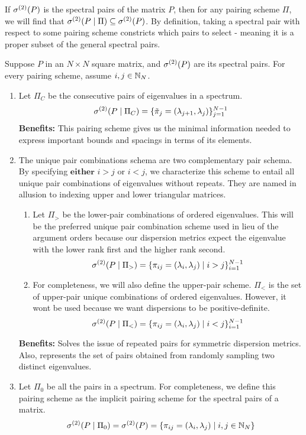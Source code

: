 \begin{remark} If ${\sigma^{(2)}}(P)$ is the spectral pairs of the matrix $P$, then for any pairing scheme $\Pi$, we will find that ${\sigma^{(2)}}(P \mid \Pi) \subseteq {\sigma^{(2)}}(P)$.
By definition, taking a spectral pair with respect to some pairing scheme constricts which pairs to select - meaning it is a proper subset of the general spectral pairs.
\end{remark}

{}

\noindent Suppose $P$ in an $N \times N$ square matrix, and ${\sigma^{(2)}}(P)$ are its spectral pairs. For every pairing scheme, assume $i,j \in \mathbb{N}_N$.

\begin{enumerate}
  \item Let $\Pi_C$ be the consecutive pairs of eigenvalues in a spectrum.
    $${\sigma^{(2)}}(P \mid \Pi_C) = \{{\tilde{\pi}}_{j} = (\lambda_{j + 1},\lambda_j)\}_{j = 1}^{N-1}$$
    \textbf{Benefits:} This pairing scheme gives us the minimal information needed to express important bounds and spacings in terms of its elements.
  \item The unique pair combinations schema are two complementary pair schema. By specifying $\textbf{either}$ $i > j$ or $i < j$,
    we characterize this scheme to entail all unique pair combinations of eigenvalues without repeats.
    They are named in allusion to indexing upper and lower triangular matrices. \begin{enumerate}
    \item Let $\Pi_>$ be the lower-pair combinations of ordered eigenvalues.
      This will be the preferred unique pair combination scheme used in lieu of the argument orders because our dispersion metrics expect the eigenvalue with the lower rank first and the higher rank second.
    $${\sigma^{(2)}}(P \mid \Pi_>) = \{\pi_{ij} = (\lambda_i,\lambda_j) \mid i > j\}_{i = 1}^{N-1}$$
    \item For completeness, we will also define the upper-pair scheme. $\Pi_<$ is the set of upper-pair unique combinations of ordered eigenvalues.
      However, it wont be used because we want dispersions to be positive-definite.
    $${\sigma^{(2)}}(P \mid \Pi_<) = \{\pi_{ij} = (\lambda_i,\lambda_j) \mid i < j\}_{i = 1}^{N-1}$$
    \end{enumerate}
    \textbf{Benefits:} Solves the issue of repeated pairs for symmetric dispersion metrics. Also, represents the set of pairs obtained from randomly sampling two distinct eigenvalues.
  \item Let $\Pi_0$ be all the pairs in a spectrum. For completeness, we define this pairing scheme as the implicit pairing scheme for the spectral pairs of a matrix.
    $${\sigma^{(2)}}(P \mid \Pi_0) = {\sigma^{(2)}}(P) = \{\pi_{ij} = (\lambda_{i},\lambda_j) \mid i,j \in \mathbb{N}_N\}$$
\end{enumerate}

